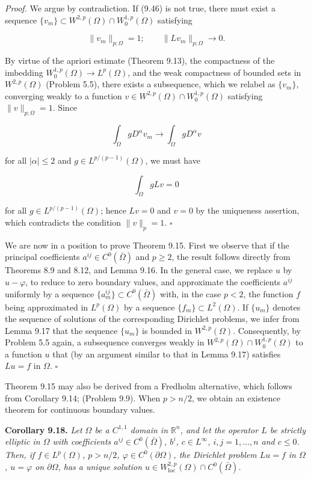 \textit{Proof.} We argue by contradiction. If (9.46) is not true, there must exist a sequence $\{v_m\} \subset W^{2,p}(\Omega) \cap W_0^{1,p}(\Omega)$ satisfying

\[
\|v_m\|_{p;\Omega} = 1;\qquad \|Lv_m\|_{p;\Omega} \to 0.
\]

By virtue of the apriori estimate (Theorem 9.13), the compactness of the imbedding $W_0^{1,p}(\Omega) \to L^p(\Omega)$, and the weak compactness of bounded sets in $W^{2,p}(\Omega)$ (Problem 5.5), there exists a subsequence, which we relabel as $\{v_m\}$, converging weakly to a function $v \in W^{2,p}(\Omega) \cap W_0^{1,p}(\Omega)$ satisfying $\|v\|_{p;\Omega} = 1$. Since

\[
\int_\Omega gD^\alpha v_m \to \int_\Omega gD^\alpha v
\]

for all $|\alpha| \le 2$ and $g \in L^{p/(p-1)}(\Omega)$, we must have

\[
\int_\Omega gLv = 0
\]



for all $g \in L^{p/(p-1)}(\Omega)$; hence $Lv = 0$ and $v = 0$ by the uniqueness assertion, which contradicts the condition $\|v\|_p = 1$. $\square$

We are now in a position to prove Theorem 9.15. First we observe that if the principal coefficients $a^{ij} \in C^0(\bar{\Omega})$ and $p \geq 2$, the result follows directly from Theorems 8.9 and 8.12, and Lemma 9.16. In the general case, we replace $u$ by $u - \varphi$, to reduce to zero boundary values, and approximate the coefficients $a^{ij}$ uniformly by a sequence $\{a_m^{ij}\} \subset C^0(\bar{\Omega})$ with, in the case $p < 2$, the function $f$ being approximated in $L^p(\Omega)$ by a sequence $\{f_m\} \subset L^2(\Omega)$. If $\{u_m\}$ denotes the sequence of solutions of the corresponding Dirichlet problems, we infer from Lemma 9.17 that the sequence $\{u_m\}$ is bounded in $W^{2,p}(\Omega)$. Consequently, by Problem 5.5 again, a subsequence converges weakly in $W^{2,p}(\Omega) \cap W^{1,p}_0(\Omega)$ to a function $u$ that (by an argument similar to that in Lemma 9.17) satisfies $Lu = f$ in $\Omega$. $\square$

Theorem 9.15 may also be derived from a Fredholm alternative, which follows from Corollary 9.14; (Problem 9.9). When $p > n/2$, we obtain an existence theorem for continuous boundary values.

\medskip

\noindent\textbf{Corollary 9.18.} \textit{Let $\Omega$ be a $C^{1,1}$ domain in $\mathbb{R}^n$, and let the operator $L$ be strictly elliptic in $\Omega$ with coefficients $a^{ij} \in C^0(\bar{\Omega})$, $b^i$, $c \in L^\infty$, $i, j = 1, \ldots, n$ and $c \leq 0$. Then, if $f \in L^p(\Omega)$, $p > n/2$, $\varphi \in C^0(\partial\Omega)$, the Dirichlet problem $Lu = f$ in $\Omega$, $u = \varphi$ on $\partial\Omega$, has a unique solution $u \in W^{2,p}_{\mathrm{loc}}(\Omega) \cap C^0(\bar{\Omega})$.}

